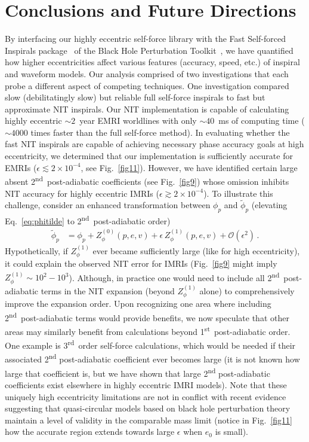 \documentclass[aps,prd,twocolumn,showpacs,notitlepage,eqsecnum,
superscriptaddress,nofootinbib]{revtex4-1}
\begin{document}
\section{Conclusions and Future Directions \label{sec:CandFD}}

By interfacing our highly eccentric self-force library with the Fast Self-forced Inspirals package~\cite{VandWarb18} of the Black Hole Perturbation Toolkit~\cite{toolkit}, we have quantified how higher eccentricities affect various features (accuracy, speed, etc.) of inspiral and waveform models. Our analysis comprised of two investigations that each probe a different aspect of competing techniques. One investigation compared slow (debilitatingly slow) but reliable full self-force inspirals to fast but approximate NIT inspirals. Our NIT implementation is capable of calculating highly eccentric $\sim 2$~year EMRI worldlines with only $\sim 40$~ms of computing time ($\sim 4000$ times faster than the full self-force method). In evaluating whether the fast NIT inspirals are capable of achieving necessary phase accuracy goals at high eccentricity, we determined that our implementation is sufficiently accurate for EMRIs ($\epsilon \lesssim 2\times 10^{-4}$, see Fig.~\ref{fig11}). However, we have identified certain large absent 2\textsuperscript{nd}~post-adiabatic coefficients (see Fig.~\ref{fig9}) whose omission inhibits NIT accuracy for highly eccentric IMRIs ($\epsilon \gtrsim 2\times 10^{-4}$). To illustrate this challenge, consider an enhanced transformation between $\phi_p$ and $\tilde{\phi}_p$ (elevating Eq.~\eqref{eq:phitilde} to 2\textsuperscript{nd}~post-adiabatic order)
\begin{align}
    \tilde{\phi}_p &= \phi_p + Z^{(0)}_\phi(p,e,v) + \epsilon \, Z^{(1)}_\phi(p,e,v) + \mathcal{O}(\epsilon^2)\, .
\end{align}
Hypothetically, if $Z^{(1)}_\phi$ ever became sufficiently large (like for high eccentricity), it could explain the observed NIT error for IMRIs (Fig.~\ref{fig9} might imply $Z^{(1)}_\phi\sim 10^{2} - 10^{3}$). Although, in practice one would need to include all 2\textsuperscript{nd}~post-adiabatic terms in the NIT expansion (beyond $Z^{(1)}_\phi$ alone) to comprehensively improve the expansion order. Upon recognizing one area where including 2\textsuperscript{nd}~post-adiabatic terms would provide benefits, we now speculate that other areas may similarly benefit from calculations beyond 1\textsuperscript{st}~post-adiabatic order. One example is 3\textsuperscript{rd}~order self-force calculations, which would be needed if their associated 2\textsuperscript{nd} post-adiabatic coefficient ever becomes large (it is not known how large that coefficient is, but we have shown that large 2\textsuperscript{nd} post-adiabatic coefficients exist elsewhere in highly eccentric IMRI models). Note that these uniquely high eccentricity limitations are not in conflict with recent evidence~\cite{warburton2021gravitationalwave,Rifat_2020} suggesting that quasi-circular models based on black hole perturbation theory maintain a level of validity in the comparable mass limit (notice in Fig.~\ref{fig11} how the accurate region extends towards large $\epsilon$ when $e_0$ is small). 
\end{document}
